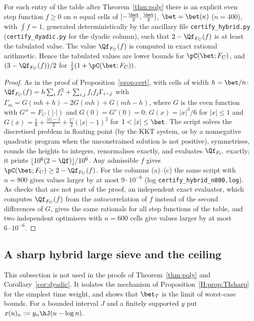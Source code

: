 \begin{proposition}\label{H:prop:cert}
For each entry of the table after Theorem~\ref{thm:poly} there is an explicit even step function $f\ge0$ on $n$ equal cells of $[-\frac\bet2,\frac\bet2]$, $\bet=\bet(\kappa)$ ($n=400$), with $\int f=1$, generated deterministically by the ancillary file \texttt{certify\_hybrid.py} (\texttt{certify\_dyadic.py} for the dyadic column), such that $2-\Qf_{F_C}(f)$ is at least the tabulated value. The value $\Qf_{F_C}(f)$ is computed in exact rational arithmetic. Hence the tabulated values are lower bounds for $\pC(\bet;F_C)$, and $(3-\Qf_{F_C}(f))/2$ for $\frac12(1+\pC(\bet;F_C))$.
\end{proposition}
\begin{proof}
As in the proof of Proposition~\ref{prop:cert}, with cells of width $h=\bet/n$: $\Qf_{F_C}(f)=h\sum_if_i^2+\sum_{i,j}f_if_j\Gamma_{i-j}$ with $\Gamma_m=G(mh+h)-2G(mh)+G(mh-h)$, where $G$ is the even function with $G''=F_C(|\cdot|)$ and $G(0)=G'(0)=0$: $G(x)=|x|^3/6$ for $|x|\le1$ and $G(x)=\frac16+\frac{|x|-1}2+\frac C2(|x|-1)^2$ for $1<|x|\le\bet$. The script solves the discretised problem in floating point (by the KKT system, or by a nonnegative quadratic program when the unconstrained solution is not positive), symmetrises, rounds the heights to integers, renormalises exactly, and evaluates $\Qf_{F_C}$ exactly; it prints $\lfloor10^6(2-\Qf)\rfloor/10^6$. Any admissible $f$ gives $\pC(\bet;F_C)\ge2-\Qf_{F_C}(f)$. For the columns (a)--(c) the same script with $n=800$ gives values larger by at most $9\cdot10^{-6}$ (log \texttt{certify\_hybrid\_n800.log}). As checks that are not part of the proof, an independent exact evaluator, which computes $\Qf_{F_C}(f)$ from the autocorrelation of $f$ instead of the second differences of $G$, gives the same rationals for all step functions of the table, and two independent optimisers with $n=600$ cells give values larger by at most $6\cdot10^{-6}$.
\end{proof}

\subsection{A sharp hybrid large sieve and the ceiling}\label{H:sec:SH}

This subsection is not used in the proofs of Theorem~\ref{thm:poly} and Corollary~\ref{cor:dyadic}. It isolates the mechanism of Proposition~\ref{H:prop:TIsharp} for the simplest time weight, and shows that $\bet_T$ is the limit of worst-case bounds. For a bounded interval $J$ and a finitely supported $y$ put $x(u)_n:=y_n\hJ(u-\log n)$.

